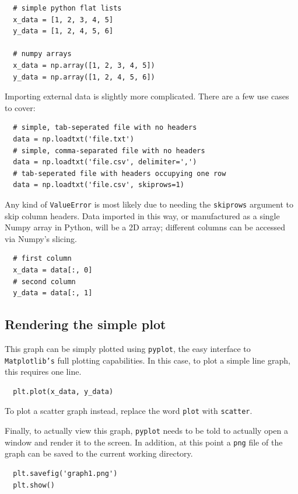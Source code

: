 \documentclass{article}
\begin{document}
\begin{lstlisting}
  # simple python flat lists
  x_data = [1, 2, 3, 4, 5]
  y_data = [1, 2, 4, 5, 6]

  # numpy arrays
  x_data = np.array([1, 2, 3, 4, 5])
  y_data = np.array([1, 2, 4, 5, 6])
\end{lstlisting}

Importing external data is slightly more complicated. There are a few
use cases to cover:

\begin{lstlisting}
  # simple, tab-seperated file with no headers
  data = np.loadtxt('file.txt')
  # simple, comma-separated file with no headers
  data = np.loadtxt('file.csv', delimiter=',')
  # tab-seperated file with headers occupying one row
  data = np.loadtxt('file.csv', skiprows=1)
\end{lstlisting}

Any kind of \texttt{ValueError} is most likely due to needing the
\texttt{skiprows} argument to skip column headers. Data imported in
this way, or manufactured as a single Numpy array in Python, will be a
2D array; different columns can be accessed via Numpy's slicing.

\begin{lstlisting}
  # first column
  x_data = data[:, 0]
  # second column
  y_data = data[:, 1]
\end{lstlisting}

\subsection{Rendering the simple plot}
This graph can be simply plotted using \texttt{pyplot}, the easy
interface to \texttt{Matplotlib's} full plotting capabilities. In this
case, to plot a simple line graph, this requires one line.

\begin{lstlisting}
  plt.plot(x_data, y_data)
\end{lstlisting}

To plot a scatter graph instead, replace the word \texttt{plot} with
\texttt{scatter}.

Finally, to actually view this graph, \texttt{pyplot} needs to be told
to actually open a window and render it to the screen. In addition, at
this point a \texttt{png} file of the graph can be saved to the
current working directory.

\begin{lstlisting}
  plt.savefig('graph1.png')
  plt.show()
\end{lstlisting}
\end{document}
